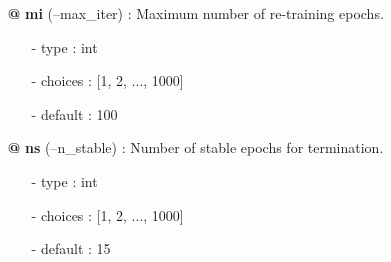 {\begin{minipage}{\textwidth}
\begin{tcolorbox}[boxsep=0pt,top=10pt,left=10pt,right=10pt, bottom=10pt, arc=0pt, auto outer arc, colback=white, colframe=lightgray]
\begin{itemize}
\item[\textbf{@}] \textbf{mi} (--max\_iter) : Maximum number of re-training epochs.
\begin{itemize}
\item[-] type    \hspace{15pt}	: int
\item[-] choices \hspace{4pt} 	: [1, 2, ..., 1000]
\item[-] default \hspace{4pt} 	: 100 
\end{itemize}
\item[\textbf{@}] \textbf{ns} (--n\_stable) : Number of stable epochs for termination.
\begin{itemize}
\item[-] type    \hspace{15pt}	: int
\item[-] choices \hspace{4pt} 	: [1, 2, ..., 1000]
\item[-] default \hspace{4pt} 	: 15 
\end{itemize} 
\end{itemize}
\end{tcolorbox}
\end{minipage}}
